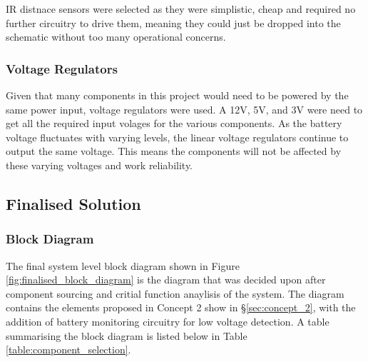 \documentclass [11pt]{article}
\begin{document}
IR distnace sensors were selected as they were simplistic, cheap and required no further circuitry to drive them, meaning they could just be dropped into the schematic without too many operational concerns. 

\subsubsection{Voltage Regulators}

Given that many components in this project would need to be powered by the same power input, voltage regulators were used. A 12V, 5V, and 3V were need to get all the required input volages for the various components. As the battery voltage fluctuates with varying levels, the linear voltage regulators continue to output the same voltage. This means the components will not be affected by these varying voltages and work reliability.

\subsection{Finalised Solution}

\subsubsection{Block Diagram}

The final system level block diagram shown in Figure \ref{fig:finalised_block_diagram} is the diagram that was decided upon after component sourcing and critial function anaylisis of the system. The diagram contains the elements proposed in Concept 2 show in §\ref{sec:concept_2}, with the addition of battery monitoring circuitry for low voltage detection. A table summarising the block diagram is listed below in Table \ref{table:component_selection}.
\end{document}
